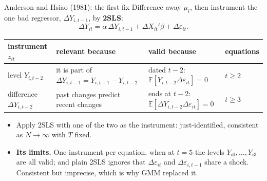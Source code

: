 \documentclass[
  11pt,
  ignorenonframetext,
  aspectratio=169,
]{beamer}
\providecommand{\tightlist}{%
  \setlength{\itemsep}{0pt}\setlength{\parskip}{0pt}}
\begin{document}
\begin{frame}{Anderson and Hsiao (1981): the first fix}
\protect{}\label{anderson-and-hsiao-1981-the-first-fix}
Difference away \(\mu_i\), then instrument the one bad regressor,
\(\Delta Y_{i,t-1}\), by \textbf{2SLS}: \[
\Delta Y_{it} = \alpha\,\Delta Y_{i,t-1} + \Delta X_{it}'\beta + \Delta\varepsilon_{it}.
\]

\begin{center}\footnotesize
\begin{tabular}{R{2.6cm}R{4.3cm}R{4.6cm}l}
\toprule
instrument $z_{it}$ & relevant because & valid because & equations \\
\midrule
level $Y_{i,t-2}$ & it is part of $\Delta Y_{i,t-1} = Y_{i,t-1} - Y_{i,t-2}$ & dated $t-2$: $\mathbb{E}[Y_{i,t-2}\Delta\varepsilon_{it}] = 0$ & $t \ge 2$ \\
difference $\Delta Y_{i,t-2}$ & past changes predict recent changes & ends at $t-2$: $\mathbb{E}[\Delta Y_{i,t-2}\Delta\varepsilon_{it}] = 0$ & $t \ge 3$ \\
\bottomrule
\end{tabular}
\end{center}

\begin{itemize}
\tightlist
\item
  Apply 2SLS with one of the two as the instrument: just-identified,
  consistent as \(N \to \infty\) with \(T\) fixed.
\item
  \textbf{Its limits.} One instrument per equation, when at \(t = 5\)
  the levels \(Y_{i0}, \dots, Y_{i3}\) are all valid; and plain 2SLS
  ignores that \(\Delta\varepsilon_{it}\) and
  \(\Delta\varepsilon_{i,t-1}\) share a shock. Consistent but imprecise,
  which is why GMM replaced it.
\end{itemize}
\end{frame}
\end{document}
